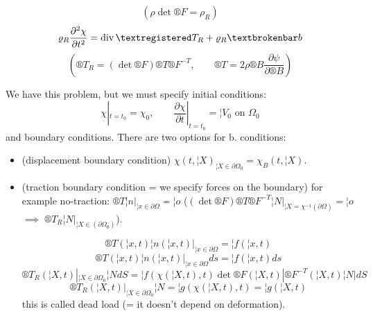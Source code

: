 \documentclass[12pt]{article}					%
\begin{document}
\begin{poznamka}
	$$ (\rho \det ®F = \rho_R) $$
	$$ \rho_R \frac{\partial^2 \chi}{\partial t^2} = \Div ®T_R + \rho_R ¦b $$
	$$ (®T_R = (\det ®F)®T®F^{-T}, \qquad ®T = 2\rho ®B \frac{\partial \psi}{\partial ®B}) $$

	We have this problem, but we must specify initial conditions:
	$$ \chi|_{t = t_0} = \chi_0, \qquad \frac{\partial \chi}{\partial t}|_{t=t_0} = ¦V_0 \text{ on }\Omega_0 $$
	and boundary conditions. There are two options for b. conditions:
	\begin{itemize}
		\item (displacement boundary condition) $\chi(t, ¦X)_{¦X \in \partial \Omega_0} = \chi_B(t, ¦X)$.
		\item (traction boundary condition = we specify forces on the boundary) for example no-traction: $®T¦n |_{¦x \in \partial \Omega} = ¦o$ ($(\det ®F) ®T ®F^{-T}¦N|_{¦X = \chi^{-1}(\partial \Omega)} = ¦o$ $\implies$ $®T_R ¦N|_{¦X \in (\partial \Omega_0)}$).

			$$ ®T(¦x, t)¦n(¦x, t)|_{¦x \in \partial \Omega} = ¦f(¦x, t) $$
			$$ ®T(¦x, t)¦n(¦x, t)|_{¦x \in \partial \Omega} ds = ¦f(¦x, t) ds $$
			$$ ®T_R(¦X, t)|_{¦X \in \partial\Omega_0} ¦NdS = ¦f(\chi(¦X, t), t)\det ®F(¦X, t) |®F^{-T}(¦X, t)¦N| dS $$
			$$ ®T_R(¦X, t)|_{¦X \in \partial\Omega_0} ¦N = ¦g(\chi(¦X, t), t) = ¦g(¦X, t) $$
			this is called dead load (= it doesn't depend on deformation).
	\end{itemize}
\end{poznamka}
\end{document}
